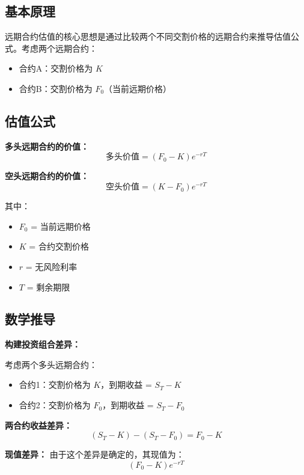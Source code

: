 \subsection{基本原理}

远期合约估值的核心思想是通过比较两个不同交割价格的远期合约来推导估值公式。考虑两个远期合约：
\begin{itemize}
\item 合约A：交割价格为 $K$
\item 合约B：交割价格为 $F_0$（当前远期价格）
\end{itemize}

\subsection{估值公式}

\textbf{多头远期合约的价值：}
\begin{equation}
\text{多头价值} = (F_0 - K)e^{-rT}
\end{equation}

\textbf{空头远期合约的价值：}
\begin{equation}
\text{空头价值} = (K - F_0)e^{-rT}
\end{equation}

其中：
\begin{itemize}
\item $F_0$ = 当前远期价格
\item $K$ = 合约交割价格
\item $r$ = 无风险利率
\item $T$ = 剩余期限
\end{itemize}

\subsection{数学推导}

\textbf{构建投资组合差异：}

考虑两个多头远期合约：
\begin{itemize}
\item 合约1：交割价格为 $K$，到期收益 = $S_T - K$
\item 合约2：交割价格为 $F_0$，到期收益 = $S_T - F_0$
\end{itemize}

\textbf{两合约收益差异：}
\begin{equation}
(S_T - K) - (S_T - F_0) = F_0 - K
\end{equation}

\textbf{现值差异：}
由于这个差异是确定的，其现值为：
\begin{equation}
(F_0 - K)e^{-rT}
\end{equation}

